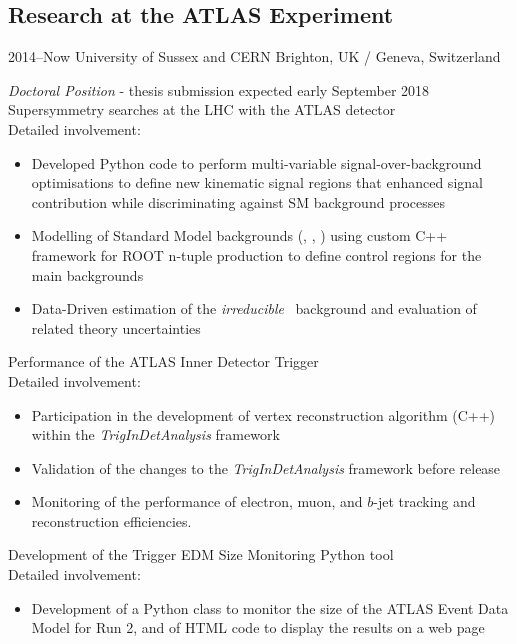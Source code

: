 \documentclass[print]{cv} %
\begin{document}
  \subsection{Research at the ATLAS Experiment}
  \begin{entrylist}
    \entry
        {2014--Now}
        {University of Sussex and CERN}
        {Brighton, UK / Geneva, Switzerland}
        {\emph{Doctoral Position} - thesis submission expected early September 2018\\
        Supersymmetry searches at the LHC with the ATLAS detector\\
        Detailed involvement: 
        \begin{itemize}
          \item Developed Python code to perform multi-variable signal-over-background optimisations to define new kinematic signal regions that enhanced signal contribution while discriminating against SM background processes
          \item Modelling of Standard Model backgrounds (\ttbar, \Wjets, \Zjets) using custom C++ framework for ROOT n-tuple production to define control regions for the main backgrounds 
          \item Data-Driven estimation of the \emph{irreducible} \ttZ\ background and evaluation of related theory uncertainties
        \end{itemize}\medskip
        Performance of the ATLAS Inner Detector Trigger\\
        Detailed involvement: 
        \begin{itemize}
          \item Participation in the development of vertex reconstruction algorithm (C++) within the \emph{TrigInDetAnalysis} framework
          \item Validation of the changes to the \emph{TrigInDetAnalysis} framework before release
          \item Monitoring of the performance of electron, muon, and $b$-jet tracking and reconstruction efficiencies.
        \end{itemize}\medskip
        Development of the Trigger EDM Size Monitoring Python tool\\
        Detailed involvement: 
        \begin{itemize}
          \item Development of a Python class to monitor the size of the ATLAS Event Data Model for Run 2, and of HTML code to display the results on a web page
        \end{itemize}      
        }
  \end{entrylist}
\end{document}
